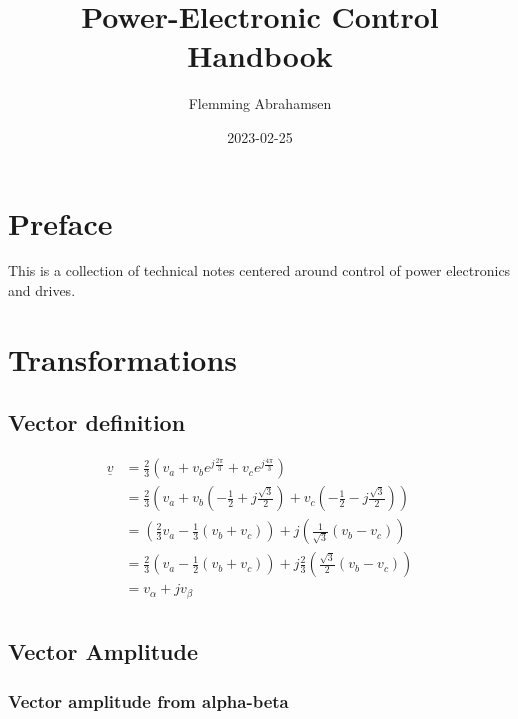 \documentclass[]{book}
\title{Power-Electronic Control Handbook}
\author{Flemming Abrahamsen}
\date{2023-02-25}
\begin{document}
\maketitle

{
\setcounter{tocdepth}{1}
\tableofcontents
}
\hypertarget{preface}{%
\chapter{Preface}\label{preface}}

This is a collection of technical notes centered around control of power electronics and drives.

\hypertarget{transformations}{%
\chapter{Transformations}\label{transformations}}

\hypertarget{vector-definition}{%
\section{Vector definition}\label{vector-definition}}

\[
\begin{aligned}
\underline{v} 
& = \frac{2}{3} \left( v_a + v_b e^{j \frac{2 \pi}{3}}+ v_c e^{j \frac{4 \pi}{3}} \right)\\
& = \frac{2}{3} \left( v_a + v_b (- \frac{1}{2}+j\frac{\sqrt{3}}{2}) + v_c (- \frac{1}{2}-j\frac{\sqrt{3}}{2}) \right)\\
& = \left(\frac{2}{3} v_a - \frac{1}{3}  (v_b+v_c) \right) + j \left( \frac{1}{\sqrt{3}} (v_b-v_c) \right)   \\
& = \frac{2}{3} \left( v_a - \frac{1}{2}  (v_b+v_c) \right) + j \frac{2}{3} \left( \frac{\sqrt{3}}{2} (v_b-v_c) \right)   \\
& = v_\alpha + j v_\beta   \\
\end{aligned}
\label{eq:trans1}
\]

\hypertarget{vector-amplitude}{%
\section{Vector Amplitude}\label{vector-amplitude}}

\hypertarget{vector-amplitude-from-alpha-beta}{%
\subsection{Vector amplitude from alpha-beta}\label{vector-amplitude-from-alpha-beta}}
\end{document}
